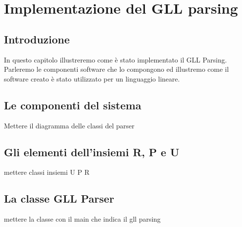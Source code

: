 \chapter{Implementazione del GLL parsing}
\section{Introduzione}
In questo capitolo illustreremo come è stato implementato il GLL Parsing. Parleremo le componenti software che lo compongono ed illustremo come il software creato è stato utilizzato per un linguaggio lineare.
\section{Le componenti del sistema}
Mettere il diagramma delle classi del parser
\section{Gli elementi dell'insiemi R, P e U}
mettere classi insiemi U P R
\section{La classe GLL Parser}
mettere la classe con il main che indica il gll parsing
